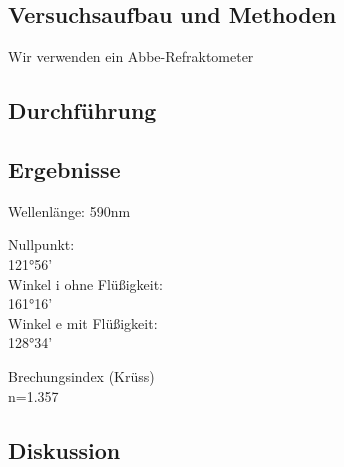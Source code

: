 \documentclass{article}
\begin{document}
\subsection{Versuchsaufbau und Methoden}
Wir verwenden ein Abbe-Refraktometer
\subsection{Durchführung}
\subsection{Ergebnisse}
Wellenlänge: 590nm

Nullpunkt:\\
121°56'\\
Winkel i ohne Flüßigkeit:\\
161°16'\\
Winkel e mit Flüßigkeit:\\
128°34'

Brechungsindex (Krüss)\\
n=1.357\\

\subsection{Diskussion}
\end{document}
